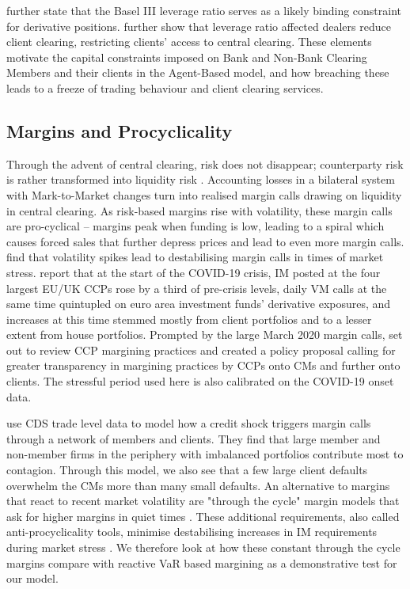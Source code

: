 \cite{haynes_mcphail_zhu_2019} further state that the Basel III leverage ratio serves as a likely binding constraint for derivative positions. \cite{acosta_smith_2018} further show that leverage ratio affected dealers reduce client clearing, restricting clients' access to central clearing. These elements motivate the capital constraints imposed on Bank and Non-Bank Clearing Members and their clients in the Agent-Based model, and how breaching these leads to a freeze of trading behaviour and client clearing services. 

\subsection{Margins and Procyclicality}

Through the advent of central clearing, risk does not disappear; counterparty risk is rather transformed into liquidity risk \citep{cont_2017}. Accounting losses in a bilateral system with Mark-to-Market changes turn into realised margin calls drawing on liquidity in central clearing. As risk-based margins rise with volatility, these margin calls are pro-cyclical \citep{brunnermeier_pedersen_2009} -- margins peak when funding is low, leading to a spiral which causes forced sales that further depress prices and lead to even more margin calls. \cite{glasserman_wu_2018} find that volatility spikes lead to destabilising margin calls in times of market stress. \cite{esrb_2020} report that at the start of the COVID-19 crisis, IM posted at the four largest EU/UK CCPs rose by a third of pre-crisis levels, daily VM calls at the same time quintupled on euro area investment funds' derivative exposures, and increases at this time stemmed mostly from client portfolios and to a lesser extent from house portfolios. Prompted by the large March 2020 margin calls, \cite{bcbs_cpmi_iosco_2025} set out to review CCP margining practices and created a policy proposal calling for greater transparency in margining practices by CCPs onto CMs and further onto clients. The stressful period used here is also calibrated on the COVID-19 onset data. 

 \cite{paddrik_rajan_young_2020} use CDS trade level data to model how a credit shock triggers margin calls through a network of members and clients. They find that large member and non-member firms in the periphery with imbalanced portfolios contribute most to contagion. Through this model, we also see that a few large client defaults overwhelm the CMs more than many small defaults. An alternative to margins that react to recent market volatility are "through the cycle" margin models that ask for higher margins in quiet times \citep{glasserman_wu_2018}. These additional requirements, also called anti-procyclicality tools, minimise destabilising increases in IM requirements during market stress \citep{blanck_2025}. We therefore look at how these constant through the cycle margins compare with reactive VaR based margining as a demonstrative test for our model.

